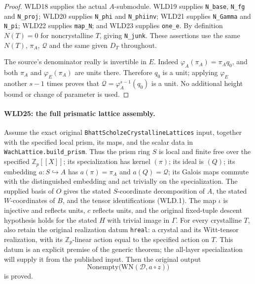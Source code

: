 \documentclass[11pt,a4paper]{article}
\numberwithin{equation}{section}
\theoremstyle{remark}\newtheorem{remark}[theorem]{Remark}
\begin{document}
\begin{proof}
WLD18 supplies the actual $A$-submodule. WLD19 supplies
\texttt{N\_\allowbreak base}, \texttt{N\_\allowbreak fg} and \texttt{N\_\allowbreak proj};
WLD20 supplies \texttt{N\_\allowbreak phi} and \texttt{N\_\allowbreak phiinv};
WLD21 supplies \texttt{N\_\allowbreak Gamma} and \texttt{N\_\allowbreak pi};
WLD22 supplies \texttt{map\_\allowbreak N}; and WLD23 supplies
\texttt{one\_\allowbreak e}. By definition $N(T)=0$ for noncrystalline
$T$, giving \texttt{N\_\allowbreak junk}. These assertions use the same
$N(T)$, $\pi_A$, $\mathcal Q$ and the same given $D_T$ throughout.

The source's denominator really is invertible in $E$. Indeed
$\varphi_A(\pi_A)=\pi_Aq_0$, and both $\pi_A$ and
$\varphi_E(\pi_A)$ are units there. Therefore $q_0$ is a unit;
applying $\varphi_E$ another $s-1$ times proves that
$\mathcal Q=\varphi_A^{s-1}(q_0)$ is a unit. No additional
height bound or change of parameter is used.
\end{proof}

\paragraph{WLD25: the full prismatic lattice assembly.}
\label{claim:WLD25}
Assume the exact original
\texttt{Bhatt\allowbreak Scholze\allowbreak Crystalline\allowbreak Lattices} input, together with the
specified local prism, its maps, and the scalar data in
\texttt{Wach\allowbreak Lattice.\allowbreak build\_\allowbreak prism}. Thus the prism ring $S$ is local
and finite free over the specified $\mathbb Z_p[[X]]$; its
specialization has kernel $(\pi)$; its ideal is $(Q)$; its
embedding $a:S\hookrightarrow A$ has $a(\pi)=\pi_A$ and
$a(Q)=\mathcal Q$; its Galois maps commute with the distinguished
embedding and act trivially on the specialization. The supplied
basis of $O$ gives the stated $S$-coordinate decomposition of
$A$, the stated $W$-coordinates of $B$, and the tensor
identifications (WLD.1). The map $\iota$ is injective and reflects
units, $c$ reflects units, and the original fixed-tuple descent
hypothesis holds for the stated $H$ with trivial image in $\Gamma$.
For every crystalline $T$, also retain the original realization
datum \texttt{hreal}: a crystal and its Witt-tensor realization,
with its $\mathbb Z_p$-linear action equal to the specified action
on $T$. This datum is an explicit premise of the generic theorem;
the all-layer specialization will supply it from the published input.
Then the original output
\[
                         \mathrm{Nonempty}\bigl(
                         \mathrm{WN}(\mathcal D,a\circ z)\bigr)
                                                               \tag{WLD.26}
\]
is proved.
\end{document}
